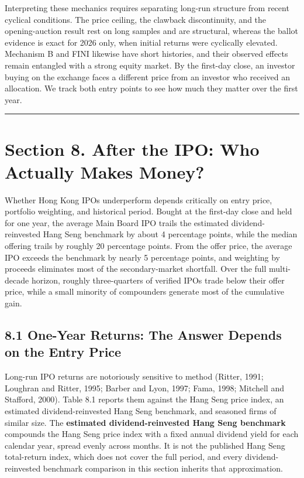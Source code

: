 \documentclass[11pt,letterpaper]{article}
\begin{document}
Interpreting these mechanics requires separating long-run structure from recent cyclical conditions. The price ceiling, the clawback discontinuity, and the opening-auction result rest on long samples and are structural, whereas the ballot evidence is exact for 2026 only, when initial returns were cyclically elevated. Mechanism B and FINI likewise have short histories, and their observed effects remain entangled with a strong equity market. By the first-day close, an investor buying on the exchange faces a different price from an investor who received an allocation. We track both entry points to see how much they matter over the first year.

\par\medskip\noindent\rule{\linewidth}{0.35pt}\par\medskip
\section*{\texorpdfstring{Section 8. After the IPO: Who Actually Makes Money?}{Section 8. After the IPO: Who Actually Makes Money?}}
Whether Hong Kong IPOs underperform depends critically on entry price, portfolio weighting, and historical period. Bought at the first-day close and held for one year, the average Main Board IPO trails the estimated dividend-reinvested Hang Seng benchmark by about 4 percentage points, while the median offering trails by roughly 20 percentage points. From the offer price, the average IPO exceeds the benchmark by nearly 5 percentage points, and weighting by proceeds eliminates most of the secondary-market shortfall. Over the full multi-decade horizon, roughly three-quarters of verified IPOs trade below their offer price, while a small minority of compounders generate most of the cumulative gain.

\subsection*{\texorpdfstring{8.1 One-Year Returns: The Answer Depends on the Entry Price}{8.1 One-Year Returns: The Answer Depends on the Entry Price}}
Long-run IPO returns are notoriously sensitive to method (Ritter, 1991; Loughran and Ritter, 1995; Barber and Lyon, 1997; Fama, 1998; Mitchell and Stafford, 2000). Table 8.1 reports them against the Hang Seng price index, an estimated dividend-reinvested Hang Seng benchmark, and seasoned firms of similar size. The \textbf{estimated dividend-reinvested Hang Seng benchmark} compounds the Hang Seng price index with a fixed annual dividend yield for each calendar year, spread evenly across months. It is not the published Hang Seng total-return index, which does not cover the full period, and every dividend-reinvested benchmark comparison in this section inherits that approximation.
\end{document}
